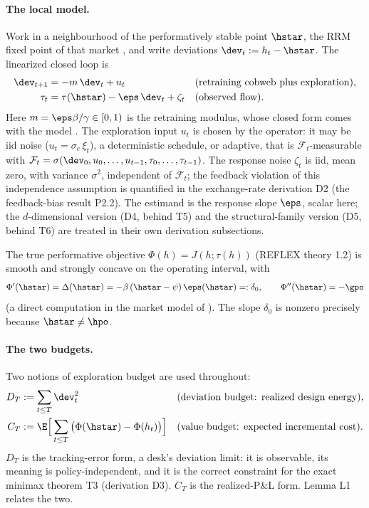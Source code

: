 \paragraph{The local model.}
Work in a neighbourhood of the performatively stable point $\hstar$, the RRM
fixed point of that market \citep{reflex2026}, and write deviations
$\dev_t := h_t - \hstar$. The linearized closed loop is
\begin{align*}
  \dev_{t+1} &= -m\,\dev_t + u_t
    && \text{(retraining cobweb plus exploration)},\\
  \tau_t &= \tau(\hstar) - \eps\,\dev_t + \zeta_t
    && \text{(observed flow)}.
\end{align*}
Here $m = \eps\beta/\gamma \in [0,1)$ is the retraining modulus, whose
closed form comes with the model \citep{reflex2026}. The exploration input $u_t$ is chosen by the operator:
it may be iid noise ($u_t = \sigma_e\,\xi_t$), a deterministic schedule, or
adaptive, that is $\mathcal{F}_t$-measurable with
$\mathcal{F}_t = \sigma(\dev_0, u_0, \dots, u_{t-1}, \tau_0, \dots,
\tau_{t-1})$. The response noise $\zeta_t$ is iid, mean zero, with variance
$\sigma^2$, independent of $\mathcal{F}_t$; the feedback violation of this
independence assumption is quantified in the exchange-rate derivation D2
(the feedback-bias result P2.2). The estimand is the response
slope $\eps$, scalar here; the $d$-dimensional version (D4, behind T5) and
the structural-family version (D5, behind T6) are treated in their own
derivation subsections.

The true performative objective $\Phi(h) = J(h; \tau(h))$ (REFLEX theory
1.2) is smooth and strongly concave on the operating interval, with
\begin{equation*}
  \Phi'(\hstar) = \Delta(\hstar) = -\beta\,(\hstar - \psi)\,\eps(\hstar)
  =: \delta_0, \qquad
  \Phi''(\hstar) = -\gpo
\end{equation*}
(a direct computation in the market model of \citet{reflex2026}). The
slope $\delta_0$ is nonzero precisely
because $\hstar \neq \hpo$.

\paragraph{The two budgets.}
Two notions of exploration budget are used throughout:
\begin{align*}
  D_T &:= \sum_{t\le T} \dev_t^2
    && \text{(deviation budget: realized design energy)},\\
  C_T &:= \E\Big[\sum_{t\le T} \big(\Phi(\hstar) - \Phi(h_t)\big)\Big]
    && \text{(value budget: expected incremental cost)}.
\end{align*}
$D_T$ is the tracking-error form, a desk's deviation limit: it is
observable, its meaning is policy-independent, and it is the correct
constraint for the exact minimax theorem T3 (derivation D3). $C_T$ is the
realized-P\&L form. Lemma L1 relates the two.

